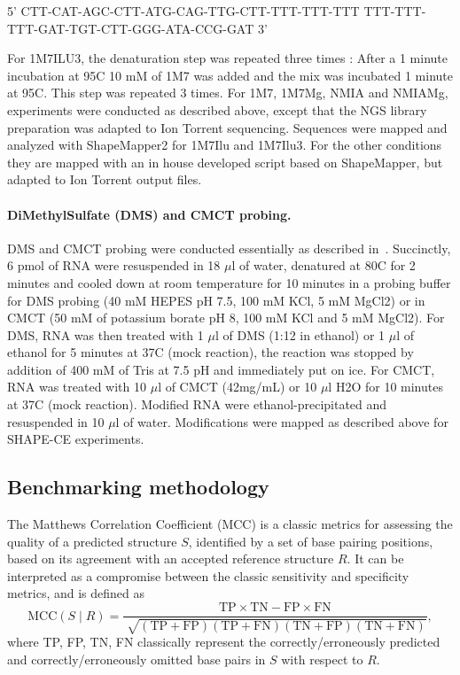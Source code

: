 \documentclass[a4,center,fleqn]{NAR}
\newcommand{\Ref}{R}
\begin{document}
{\centering {}%
5' CTT-CAT-AGC-CTT-ATG-CAG-TTG-CTT-TTT-TTT-TTT
   TTT-TTT-TTT-GAT-TGT-CTT-GGG-ATA-CCG-GAT 3'\\}

For 1M7ILU3, the denaturation step was repeated three times : After a 1 minute incubation at 95\degree{}C 10 mM of 1M7 was added and the mix was incubated 1 minute at 95\degree{}C. This step was repeated 3 times. For 1M7, 1M7Mg, NMIA and NMIAMg, experiments were conducted as described above, except that the NGS library preparation was adapted to Ion Torrent sequencing. Sequences were mapped and analyzed with ShapeMapper2 for 1M7Ilu and 1M7Ilu3. For the other conditions they are mapped with an in house developed script based on ShapeMapper, but adapted to Ion Torrent output files.


\paragraph{DiMethylSulfate (DMS) and CMCT probing.}
DMS and CMCT probing were conducted essentially as described in~\cite{Weill2004,James2008}. Succinctly, 6 pmol of RNA were resuspended in 18 $\mu$l of water, denatured at 80\degree{}C for 2 minutes and cooled down at room temperature for 10 minutes in a probing buffer for DMS probing (40 mM HEPES pH 7.5, 100 mM KCl, 5 mM MgCl2) or in CMCT (50 mM of potassium borate pH 8, 100 mM KCl and 5 mM MgCl2). For DMS, RNA was then treated with 1 $\mu$l of DMS (1:12 in ethanol) or 1 $\mu$l of ethanol for 5 minutes at 37\degree{}C (mock reaction), the reaction was stopped by addition of 400 mM of Tris at 7.5 pH and immediately put on ice. For CMCT,  RNA was treated with 10 $\mu$l of CMCT (42mg/mL) or 10 $\mu$l H2O for 10 minutes at 37\degree{}C (mock reaction). Modified RNA were ethanol-precipitated and resuspended in 10 $\mu$l of water. Modifications were mapped as described above for SHAPE-CE experiments.


\subsection*{Benchmarking methodology}

The Matthews Correlation Coefficient (MCC) is a classic metrics for assessing the quality of a predicted structure $S$, identified by a set of base pairing positions, based on its agreement with an accepted reference structure $\Ref$. It can be interpreted as a compromise between the classic sensitivity and specificity metrics, and is defined as 
$$\text{MCC}(S\mid \Ref)=\frac{\text{TP} \times \text{TN} -\text{FP} \times \text{FN}}{\sqrt[]{(\text{TP}+\text{FP})(\text{TP}+\text{FN})(\text{TN}+\text{FP})(\text{TN}+\text{FN})}},$$
where TP, FP, TN, FN classically represent the correctly/erroneously predicted and correctly/erroneously omitted base pairs in $S$ with respect to $\Ref$.
\end{document}
